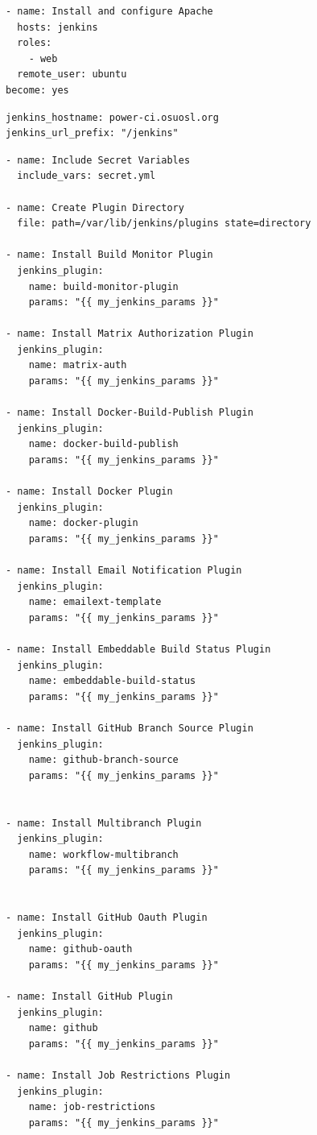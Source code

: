 \documentclass[10pt,letterpaper,onecolumn,draftclsnofoot]{IEEEtran}
\begin{document}
\begin{lstlisting}[caption=Ansible Apache Playbook]
- name: Install and configure Apache
  hosts: jenkins
  roles:
    - web
  remote_user: ubuntu
become: yes
\end{lstlisting}



\begin{lstlisting}[caption=Playbook Variables]
jenkins_hostname: power-ci.osuosl.org
jenkins_url_prefix: "/jenkins"
\end{lstlisting}

\begin{lstlisting}[caption=Jenkins Task]
- name: Include Secret Variables
  include_vars: secret.yml

- name: Create Plugin Directory
  file: path=/var/lib/jenkins/plugins state=directory

- name: Install Build Monitor Plugin
  jenkins_plugin:
    name: build-monitor-plugin
    params: "{{ my_jenkins_params }}"

- name: Install Matrix Authorization Plugin
  jenkins_plugin:
    name: matrix-auth
    params: "{{ my_jenkins_params }}"

- name: Install Docker-Build-Publish Plugin
  jenkins_plugin:
    name: docker-build-publish
    params: "{{ my_jenkins_params }}"

- name: Install Docker Plugin
  jenkins_plugin:
    name: docker-plugin
    params: "{{ my_jenkins_params }}"

- name: Install Email Notification Plugin
  jenkins_plugin:
    name: emailext-template
    params: "{{ my_jenkins_params }}"

- name: Install Embeddable Build Status Plugin
  jenkins_plugin:
    name: embeddable-build-status 
    params: "{{ my_jenkins_params }}"

- name: Install GitHub Branch Source Plugin
  jenkins_plugin:
    name: github-branch-source
    params: "{{ my_jenkins_params }}"


- name: Install Multibranch Plugin
  jenkins_plugin:
    name: workflow-multibranch
    params: "{{ my_jenkins_params }}"


- name: Install GitHub Oauth Plugin
  jenkins_plugin:
    name: github-oauth
    params: "{{ my_jenkins_params }}"

- name: Install GitHub Plugin
  jenkins_plugin:
    name: github 
    params: "{{ my_jenkins_params }}"

- name: Install Job Restrictions Plugin
  jenkins_plugin:
    name: job-restrictions 
    params: "{{ my_jenkins_params }}"


\end{lstlisting}
\end{document}
